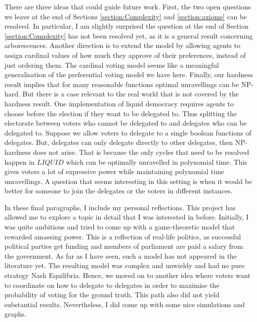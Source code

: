 \documentclass[11pt,a4paper, titlepage]{article}
\theoremstyle{definition}
\newcommand{\LIQUID}{\mathit{LIQUID}}
\begin{document}
There are three ideas that could guide future work. First, the two open questions we leave at the end of Sections \ref{section:Complexity} and \ref{section:axioms} can be resolved. In particular, I am slightly surprised the question at the end of Section \ref{section:Complexity} has not been resolved yet, as it is a general result concerning arborescences.
Another direction is to extend the model by allowing agents to assign cardinal values of how much they approve of their preferences, instead of just ordering them.
The cardinal voting model seems like a meaningful generalisation of the preferential voting model we have here.
Finally, our hardness result implies that for many reasonable functions optimal unravellings can be NP-hard.
But there is a case relevant to the real world that is not covered by the hardness result.
One implementation of liquid democracy requires agents to choose before the election if they want to be delegated to.
Thus splitting the electorate between voters who cannot be delegated to and delegates who can be delegated to. 
Suppose we allow voters to delegate to a single boolean functions of delegates. 
But, delegates can only delegate directly to other delegates, then NP-hardness does not arise.
That is because the only cycles that need to be resolved happen in $\LIQUID$ which can be optimally unravelled in polynomial time.
This gives voters a lot of expressive power while maintaining polynomial time unravellings. 
A question that seems interesting in this setting is when it would be better for someone to join the delegates or the voters in different instances.

In these final paragraphs, I include my personal reflections.
This project has allowed me to explore a topic in detail that I was interested in before.
Initially, I was quite ambitious and tried to come up with a game-theoretic model that rewarded amassing power.
This is a reflection of real-life politics, as successful political parties get funding and members of parliament are paid a salary from the government.
As far as I have seen, such a model has not appeared in the literature yet.
The resulting model was complex and unwieldy and had no pure strategy Nash Equilibria.
Hence, we moved on to another idea where voters want to coordinate on how to delegate to delegates in order to maximise the probability of voting for the ground truth.
This path also did not yield substantial results. Nevertheless, I did come up with some nice simulations and graphs.
\end{document}
